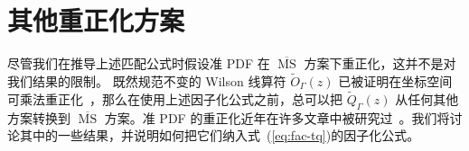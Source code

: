 \section{其他重正化方案}
\label{sec:ren}

尽管我们在推导上述匹配公式时假设准 PDF 在 $\overline{\ensuremath{\operatorname{MS}}}$ 方案下重正化，这并不是对我们结果的限制。
既然规范不变的 Wilson 线算符 $\tilde{O}_\Gamma(z)$ 已被证明在坐标空间可乘法重正化~\cite{Ji:2017oey,Ishikawa:2017faj}，那么在使用上述因子化公式之前，总可以把 $\tilde{Q}_{\Gamma}(z)$ 从任何其他方案转换到 $\overline{\ensuremath{\operatorname{MS}}}$ 方案。准 PDF 的重正化近年在许多文章中被研究过~\cite{Ji:2015jwa,Ishikawa:2016znu,Chen:2016fxx,Xiong:2017jtn,Constantinou:2017sej,Alexandrou:2017huk,Chen:2017mzz,Green:2017xeu,Stewart:2017tvs,Wang:2017eel}。我们将讨论其中的一些结果，并说明如何把它们纳入式~(\ref{eq:fac-tq})的因子化公式。

